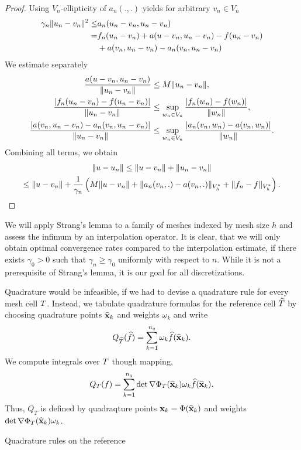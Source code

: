 \begin{proof}
  Using $V_n$-ellipticity of $a_n(.,.)$ yields for arbitrary $v_n\in V_n$
  \begin{align*}
    \gamma_n \lVert u_n-v_n\rVert^2
    \le &a_n(u_n-v_n,u_n-v_n)\\
    =& f_n(u_n-v_n) + a(u-v_n, u_n-v_n)
       - f(u_n-v_n)
    \\ &+ a(v_n,u_n-v_n) - a_n(v_n, u_n-v_n)
  \end{align*}
  We estimate separately
  \begin{align*}
    \frac{a(u-v_n, u_n-v_n)}{\lVert u_n-v_n\rVert}
    &\le M \lVert u_n-v_n\rVert,\\
    \frac{\lvert f_n(u_n-v_n) - f(u_n-v_n)\rvert}{\lVert u_n-v_n\rVert}
    &\le \sup_{w_n\in V_n} \frac{\lvert f_n(w_n)-f(w_n)\rvert}{\lVert w_n\rVert},
    \\
    \frac{\lvert a(v_n,u_n-v_n) - a_n(v_n, u_n-v_n)\rvert}{\lVert u_n-v_n\rVert}
    &\le \sup_{w_n\in V_n} \frac{\lvert a_n(v_n, w_n)-a(v_n,w_n)\rvert}{\lVert w_n\rVert}.
  \end{align*}
  Combining all terms, we obtain
  \begin{multline}
    \lVert u-u_n\rVert
    \le \lVert u-v_n\rVert + \lVert u_n-v_n\rVert \\
    \le \lVert u-v_n\rVert + \frac1{\gamma_n}\left(
         M \lVert u-v_n\rVert
         + \lVert a_n(v_n,.)-a(v_n,.)\rVert_{V_h^*}
         + \lVert f_n-f\rVert_{V_h^*}\right).
  \end{multline}
\end{proof}

\begin{remark}
  We will apply Strang's lemma to a family of meshes indexed by mesh
  size $h$ and assess the infimum by an interpolation operator. It is
  clear, that we will only obtain optimal convergence rates compared
  to the interpolation estimate, if there exists $\gamma_0 >0$ such
  that $\gamma_n \ge \gamma_0$ uniformly with respect to $n$. While it
  is not a prerequisite of Strang's lemma, it is our goal for all
  discretizations.
\end{remark}

\begin{remark}
  Quadrature would be infeasible, if we had to devise a quadrature
  rule for every mesh cell $T$. Instead, we tabulate quadrature
  formulas for the reference cell $\widehat{T}$ by choosing quadrature
  points $\widehat{\mathbf x}_k$ and weights $\omega_k$ and write
  \begin{gather}
    Q_{\widehat{T}}(\widehat{f})
    = \sum_{k=1}^{n_q} \omega_k \widehat{f}(\widehat{\mathbf x}_k).
  \end{gather}
  We compute integrals over $T$ though mapping,
  \begin{gather}
    Q_T(f) = \sum_{k=1}^{n_q} \det\nabla\Phi_T(\widehat{\mathbf x}_k) \omega_k \widehat{f}(\widehat{\mathbf x}_k).
  \end{gather}
  Thus, $Q_T$ is defined by quadraqture points
  $\mathbf x_k = \Phi(\widehat{\mathbf x}_k)$ and weights
  $\det\nabla\Phi_T(\widehat{\mathbf x}_k) \omega_k$.

  Quadrature rules on the reference 
\end{remark}

